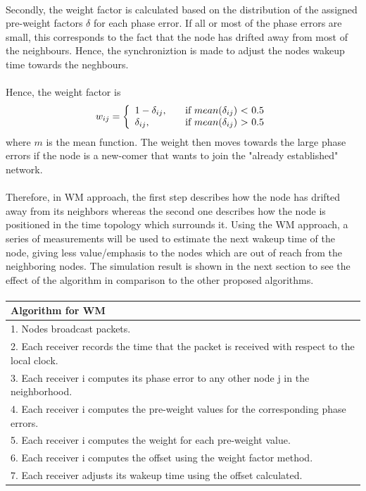 \documentclass[a4paper,10pt]{report}
\begin{document}
\paragraph*{} \noindent
Secondly, the weight factor is calculated based on the distribution of the assigned pre-weight factors $\delta$ for each phase error. If all or most of the phase errors are small, this corresponds to the fact that the node has drifted away from most of the neighbours. Hence, the synchroniztion is made to adjust the nodes wakeup time towards the neghbours. \paragraph*{} \noindent
Hence, the weight factor is
\[w_{ij} = \left\{
\begin{array}{l l}
  1 - \delta_{ij},& \quad \mbox{if $mean(\delta_{ij}$) $<$ 0.5}\\
 \delta_{ij}, & \quad \mbox{if $mean(\delta_{ij}$) $>$ 0.5}\\ \end{array} \right. \]
where $m$ is the mean function.
The weight then moves towards the large phase errors if the node is a new-comer that wants to join the "already established" network.
\paragraph*{}
Therefore, in WM approach, the first step describes how the node has drifted away from its neighbors whereas the second one describes how the node is positioned in the time topology which surrounds it. Using the WM approach, a series of measurements will be used to estimate the next wakeup time of the node, giving less value/emphasis to the nodes which are out of reach from the neighboring nodes. The simulation result is shown in the next section to see the effect of the algorithm in comparison to the other proposed algorithms.\paragraph*{}
\begin{tabular}{  l }Algorithm for WM \\\hline \hline
1. Nodes broadcast packets. \\  2. Each receiver records the time that the packet is received with respect to the local clock. \\
3. Each receiver i computes its phase error to any other node j in the neighborhood. \\
4. Each receiver i computes the pre-weight values for the corresponding phase errors. \\
5. Each receiver i computes the weight for each pre-weight value. \\
6. Each receiver i computes the offset using the weight factor method. \\
7. Each receiver adjusts its wakeup time using the offset calculated.\\
\hline \hline
\end{tabular}
\end{document}
